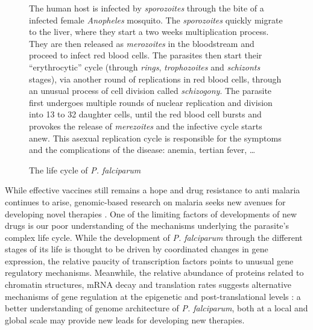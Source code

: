 \documentclass[2columns]{article}
\begin{document}
\begin{figure}
\caption{The life cycle of {\em P. falciparum}}{
\small
The human host is infected by \textit{sporozoites} through the bite of a infected female  {\em Anopheles}
mosquito. The \textit{sporozoites} quickly migrate to the liver, where they
start a two weeks multiplication process. They are then released as
\textit{merozoites} in the bloodstream and proceed to infect red blood cells. The
parasites then start their ``erythrocytic'' cycle (through \textit{rings},
\textit{trophozoites} and \textit{schizonts} stages), via another round of
replications in red blood cells, through an unusual process of cell division
called \textit{schizogony}. The parasite first undergoes multiple rounds of nuclear
replication and division into 13 to 32 daughter cells, until the red blood
cell bursts and provokes the release of \textit{merezoites} and the infective cycle
starts anew. This asexual replication cycle is responsible for the symptoms
and the complications of the disease: anemia, tertian fever, \dots}
\end{figure}

While effective vaccines still remains a hope and drug resistance to anti
malaria continues to arise, genomic-based research on malaria seeks new
avenues for developing novel therapies \citep{kirchner:recent}. One of the
limiting factors of developments of new drugs is our poor understanding of the
mechanisms underlying the parasite's complex life cycle. While the development
of {\em P. falciparum} through the different stages of its life is thought to
be driven by coordinated changes in gene expression, the relative paucity of
transcription factors points to unusual gene regulatory mechanisms. Meanwhile,
the relative abundance of proteins related to chromatin structures, mRNA decay
and translation rates suggests alternative mechanisms of gene regulation at
the epigenetic and post-translational levels \citep{cui:chromatin-mediated,
duffy:role, hoeijmakers:placing, horrocks:control, deitsch:mechanisms}:
a better understanding of genome architecture of {\em P. falciparum}, both at
a local and global scale may provide new leads for developing new therapies.
\end{document}

